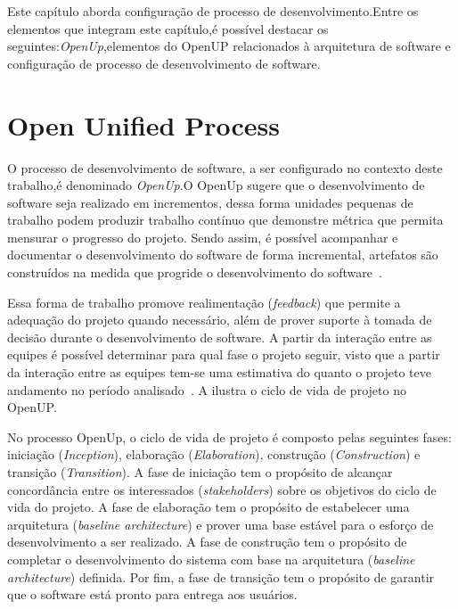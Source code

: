 Este capítulo aborda configuração de processo de desenvolvimento.Entre os elementos que integram este capítulo,é possível destacar os seguintes:\emph{\acrfull{OpenUp}},elementos do OpenUP relacionados à arquitetura de software e configuração de processo de desenvolvimento de software.

\section{Open Unified Process}

O processo de desenvolvimento de software, a ser configurado no contexto deste trabalho,é denominado \emph{\acrfull{OpenUp}}.O OpenUp sugere que o desenvolvimento de software seja realizado em incrementos, dessa forma unidades pequenas de trabalho podem produzir trabalho contínuo que demonstre métrica que permita mensurar o progresso do projeto. Sendo assim, é possível acompanhar e documentar o desenvolvimento do software de forma incremental, artefatos são construídos na medida que progride o desenvolvimento do software~\cite{openup}. 

Essa forma de trabalho promove realimentação (\emph{feedback}) que permite a adequação do projeto quando necessário, além de prover suporte à tomada de decisão durante o desenvolvimento de software. A partir da interação entre as equipes é possível determinar para qual fase o projeto seguir, visto que a partir da interação entre as equipes tem-se uma estimativa do quanto o projeto teve andamento no período analisado~\cite{openup}. A  ilustra o ciclo de vida de projeto no OpenUP.

%

No processo OpenUp, o ciclo de vida de projeto é composto pelas seguintes fases: iniciação (\emph{Inception}), elaboração (\emph{Elaboration}), construção (\emph{Construction}) e transição (\emph{Transition}). A fase de iniciação tem o propósito de alcançar concordância entre os interessados (\emph{stakeholders}) sobre os objetivos do ciclo de vida do projeto. A fase de elaboração tem o propósito de estabelecer uma arquitetura (\emph{baseline architecture}) e prover uma base estável para o esforço de desenvolvimento a ser realizado. A fase de construção tem o propósito de completar o desenvolvimento do sistema com base na arquitetura (\emph{baseline architecture}) definida. Por fim, a fase de transição tem o propósito de garantir que o software está pronto para entrega aos usuários.

